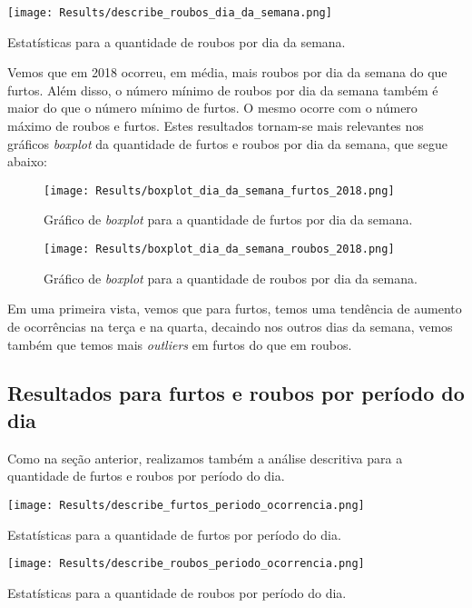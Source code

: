 \documentclass[
	12pt,
	openright,			%
	twoside,			%
	a4paper,			%
	chapter=TITLE,		%
	section=TITLE,		%
	subsection=TITLE,	%
	subsubsection=TITLE,%
	english,			%
	french,				%
	spanish,			%
	brazil				%
	]{abntex2}
\begin{document}
\begin{table}[H]
\centering
\centerline{\texttt{[image: Results/describe\_roubos\_dia\_da\_semana.png]}}
\caption{Estatísticas para a quantidade de roubos por dia da semana.}
\end{table}

Vemos que em 2018 ocorreu, em média, mais roubos por dia da semana do que furtos. Além disso, o número mínimo de roubos por dia da semana também é maior do que o número mínimo de furtos. O mesmo ocorre com o número máximo de roubos e furtos. Estes resultados  tornam-se mais relevantes nos gráficos \textit{boxplot} da quantidade de furtos e roubos por dia da semana, que segue abaixo:

\begin{figure}
\centering
\texttt{[image: Results/boxplot\_dia\_da\_semana\_furtos\_2018.png]}
\caption{Gráfico de \textit{boxplot} para a quantidade de furtos por dia da semana.}
\end{figure}

\begin{figure}
\centering
\texttt{[image: Results/boxplot\_dia\_da\_semana\_roubos\_2018.png]}
\caption{Gráfico de \textit{boxplot} para a quantidade de roubos por dia da semana.}
\end{figure}

Em uma primeira vista, vemos que para furtos, temos uma tendência de aumento de ocorrências na terça e na quarta, decaindo nos outros dias da semana, vemos também que temos mais \textit{outliers} em furtos do que em roubos.

\subsection{Resultados para furtos e roubos por período do dia}

Como na seção anterior, realizamos também a análise descritiva para a quantidade de furtos e roubos por período do dia.

\begin{table}[H]
\centering
\centerline{\texttt{[image: Results/describe\_furtos\_periodo\_ocorrencia.png]}}
\caption{Estatísticas para a quantidade de furtos por período do dia.}
\end{table}

\begin{table}[H]
\centering
\centerline{\texttt{[image: Results/describe\_roubos\_periodo\_ocorrencia.png]}}
\caption{Estatísticas para a quantidade de roubos por período do dia.}
\end{table}
\end{document}
